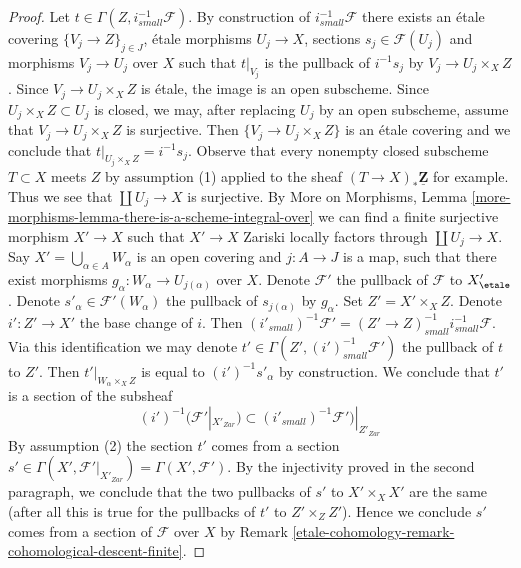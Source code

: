 \begin{proof}
\medskip\noindent
Let $t \in \Gamma(Z, i^{-1}_{small}\mathcal{F})$. By construction of
$i^{-1}_{small}\mathcal{F}$ there exists an \'etale covering
$\{V_j \to Z\}_{j \in J}$, \'etale morphisms $U_j \to X$, sections
$s_j \in \mathcal{F}(U_j)$ and morphisms $V_j \to U_j$ over $X$
such that $t|_{V_j}$ is the pullback of $i^{-1}s_j$ by
$V_j \to U_j \times_X Z$. Since $V_j \to U_j \times_X Z$ is \'etale,
the image is an open subscheme. Since $U_j \times_X Z \subset U_j$ is
closed, we may, after replacing $U_j$ by an open subscheme, assume
that $V_j \to U_j \times_X Z$ is surjective. Then $\{V_j \to U_j \times_X Z\}$
is an \'etale covering and we conclude that $t|_{U_j \times_X Z} = i^{-1}s_j$.
Observe that every nonempty closed subscheme $T \subset X$ meets $Z$
by assumption (1) applied to the sheaf $(T \to X)_*\underline{\mathbf{Z}}$
for example. Thus we see that $\coprod U_j \to X$ is surjective.
By More on Morphisms, Lemma
\ref{more-morphisms-lemma-there-is-a-scheme-integral-over}
we can find a finite surjective morphism $X' \to X$
such that $X' \to X$ Zariski locally factors through $\coprod U_j \to X$.
Say $X' = \bigcup_{\alpha \in A} W_\alpha$ is an open covering
and $j : A \to J$ is a map, such that there exist morphisms
$g_\alpha : W_\alpha \to U_{j(\alpha)}$ over $X$. Denote
$\mathcal{F}'$ the pullback of $\mathcal{F}$ to $X'_\etale$.
Denote $s'_\alpha \in \mathcal{F}'(W_\alpha)$ the pullback
of $s_{j(\alpha)}$ by $g_\alpha$.
Set $Z' = X' \times_X Z$. Denote $i' : Z' \to X'$
the base change of $i$. Then $(i'_{small})^{-1}\mathcal{F}' =
(Z' \to Z)_{small}^{-1}i_{small}^{-1}\mathcal{F}$. Via this identification
we may denote $t' \in
\Gamma(Z', (i')^{-1}_{small}\mathcal{F}')$
the pullback of $t$ to $Z'$.
Then $t'|_{W_\alpha \times_X Z}$ is equal to $(i')^{-1}s'_\alpha$ by
construction. We conclude that $t'$ is a section of
the subsheaf
$$
(i')^{-1}(\mathcal{F}'|_{X'_{Zar}})
\subset
(i'_{small})^{-1}\mathcal{F}')|_{Z'_{Zar}}
$$
By assumption (2) the section $t'$ comes from a section
$s' \in \Gamma(X', \mathcal{F}'|_{X'_{Zar}}) = \Gamma(X', \mathcal{F}')$.
By the injectivity proved in the second paragraph,
we conclude that the two pullbacks of $s'$ to
$X' \times_X X'$ are the same (after all this is true for
the pullbacks of $t'$ to $Z' \times_Z Z'$). Hence we conclude
$s'$ comes from a section of $\mathcal{F}$ over $X$ by
Remark \ref{etale-cohomology-remark-cohomological-descent-finite}.
\end{proof}

